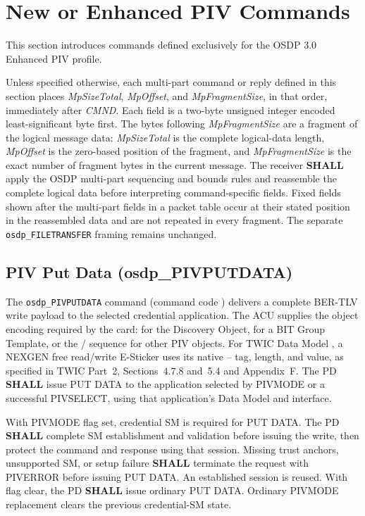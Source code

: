 \section{New or Enhanced PIV Commands}

This section introduces commands defined exclusively for the OSDP 3.0 Enhanced PIV profile.

Unless specified otherwise, each multi-part command or reply defined in this section places
\emph{MpSizeTotal}, \emph{MpOffset}, and \emph{MpFragmentSize}, in that order, immediately
after \emph{CMND}. Each field is a two-byte unsigned integer encoded least-significant byte
first. The bytes following \emph{MpFragmentSize} are a fragment of the logical message data:
\emph{MpSizeTotal} is the complete logical-data length, \emph{MpOffset} is the zero-based
position of the fragment, and \emph{MpFragmentSize} is the exact number of fragment bytes in
the current message. The receiver \textbf{SHALL} apply the OSDP multi-part sequencing and bounds
rules and reassemble the complete logical data before interpreting command-specific fields.
Fixed fields shown after the multi-part fields in a packet table occur at their stated position
in the reassembled data and are not repeated in every fragment. The separate
\texttt{osdp\_FILETRANSFER} framing remains unchanged.



\subsection{PIV Put Data (osdp\_PIVPUTDATA)}

The \texttt{osdp\_PIVPUTDATA} command (command code ) delivers a
complete BER-TLV write payload to the selected credential application. The ACU
supplies the object encoding required by the card:  for the Discovery
Object,  for a BIT Group Template, or the /
sequence for other PIV objects. For TWIC Data Model , a NEXGEN
free read/write E-Sticker uses its native -- tag, length,
and value, as specified in TWIC Part~2, Sections~4.7.8 and~5.4 and Appendix~F.
The PD \textbf{SHALL} issue PUT DATA to the application selected by PIVMODE or
a successful PIVSELECT, using that application's Data Model and interface.

With PIVMODE flag  set, credential SM is required for PUT DATA. The PD
\textbf{SHALL} complete SM establishment and validation before issuing the write,
then protect the command and response using that session. Missing trust anchors,
unsupported SM, or setup failure \textbf{SHALL} terminate the request with
PIVERROR  before issuing PUT DATA. An established session is reused.
With flag  clear, the PD \textbf{SHALL} issue ordinary PUT DATA.
Ordinary PIVMODE replacement clears the previous credential-SM state.

